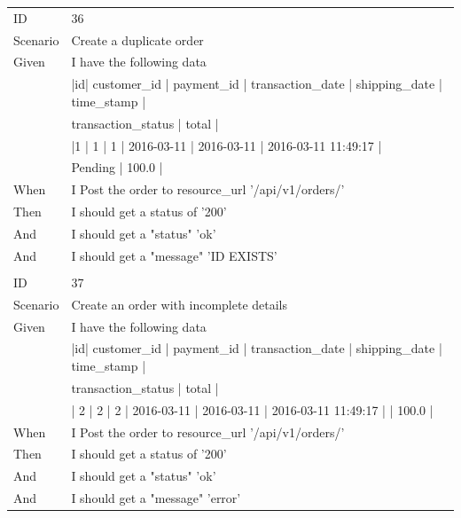 \documentclass{report}
\begin{document}
\begin{tabular}{ l l }
ID 			& 36\\
Scenario		& Create a duplicate order \\
Given 		& I have the following data \\
     		& |id| customer\_id | payment\_id | transaction\_date | shipping\_date | time\_stamp          | \\
     		& transaction\_status | total |\\
     		& |1 | 1           | 1          | 2016-03-11       | 2016-03-11    | 2016-03-11 11:49:17 | \\ 
     		& Pending            | 100.0 |\\
When 		& I Post the order to resource\_url  '/api/v1/orders/' \\
Then 		& I should get a status of '200' \\
And 			& I should get a "status" 'ok' \\
And 			& I should get a "message" 'ID EXISTS'\\ \\
ID 			& 37\\
Scenario		& Create an order with incomplete details \\
Given 		& I have the following data \\
     		& |id| customer\_id | payment\_id | transaction\_date | shipping\_date | time\_stamp          | \\ 
     		& transaction\_status | total | \\
     		& | 2 | 2           | 2          | 2016-03-11       | 2016-03-11    | 2016-03-11 11:49:17 | | 100.0 |\\
When 		& I Post the order to resource\_url  '/api/v1/orders/' \\
Then 		& I should get a status of '200' \\
And 			& I should get a "status" 'ok' \\
And 			& I should get a "message" 'error' \\
\end{tabular}
\newpage
\end{document}
